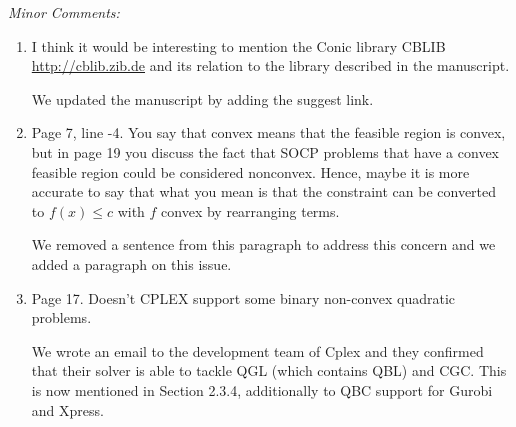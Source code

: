 \documentclass[11pt]{article}
\newcommand{\rep}[1]{{\textcolor{acblue}{#1}}}
\newcommand{\leo}[1]{{\color{red}#1}}
\begin{document}
{\it
Minor Comments:
\begin{enumerate}

\item I think it would be interesting to mention the Conic library CBLIB \url{http://cblib.zib.de} and its relation to the library described in the manuscript.

\rep{We updated the manuscript by adding the suggest link.}


\item Page 7, line -4. You say that convex means that the feasible region is
convex, but in page 19 you discuss the fact that SOCP problems that have
a convex feasible region could be considered nonconvex. Hence, maybe it
is more accurate to say that what you mean is that the constraint can be
converted to $f (x) \le c$ with $f$ convex by rearranging terms.

\rep{We removed a sentence from this paragraph to address this concern and we added a paragraph on this issue.
}

\item Page 17. Doesn't CPLEX support some binary non-convex quadratic
problems.

\rep{We wrote an email to the development team of Cplex and they confirmed that their solver is able to tackle QGL (which contains QBL) and CGC. This is now mentioned in Section 2.3.4, additionally to QBC support for Gurobi and Xpress.
}


\end{enumerate}}
\end{document}
